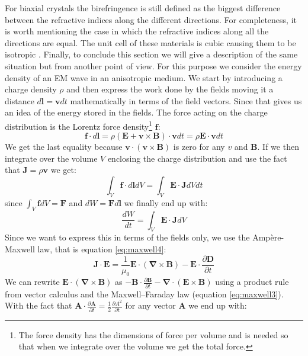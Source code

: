 For biaxial crystals the birefringence is still defined as the biggest difference between the refractive indices along the different directions. For completeness, it is worth mentioning the case in which the refractive indices along all the directions are equal. The unit cell of these materials is cubic causing them to be isotropic \cite{Hecht}. 
Finally, to conclude this section we will give a description of the same situation but from another point of view. For this purpose we consider the energy density of an EM wave in an anisotropic medium.
We start by introducing a charge density $\rho$ and then express the work done by the fields moving it a distance $d\bm{l}=\bm{v}dt$ mathematically in terms of the field vectors. Since that gives us an idea of the energy stored in the fields. The force acting on the charge distribution is the Lorentz force density\footnote{The force density has the dimensions of force per volume and is needed so that when we integrate over the volume we get the total force.} $\bm{f}$:
\begin{equation}
    \bm{f}\cdot d\bm{l}=\rho(\bm{E}+\bm{v}\times\bm{B})\cdot\bm{v}dt=\rho\bm{E}\cdot\bm{v}dt
\end{equation}
We get the last equality because $\bm{v}\cdot(\bm{v}\times\bm{B})$ is zero for any $v$ and $\bm{B}$. 
If we then integrate over the volume $V$ enclosing the charge distribution and use the fact that $\bm{J}=\rho\bm{v}$ we get:
\begin{equation}
    \int_V \bm{f}\cdot d\bm{l} dV =\int_V \bm{E}\cdot\bm{J} dVdt
\end{equation}
since $\int_V \bm{f} dV = \bm{F}$ and $dW = \bm{F} d\bm{l}$ we finally end up with:
\begin{equation}
    \label{eq:emf_work}
    \frac{dW}{dt} = \int_V \bm{E}\cdot\bm{J} dV
\end{equation}
Since we want to express this in terms of the fields only, we use the Ampère-Maxwell law, that is equation \ref{eq:maxwell4}:
\begin{equation}
    \bm{J}\cdot\bm{E} = \frac{1}{\mu_0}\bm{E}\cdot(\bm{\nabla}\times\bm{B})-\bm{E}\cdot\frac{\partial\bm{D}}{\partial t}
\end{equation}
We can rewrite $\bm{E}\cdot(\bm{\nabla}\times\bm{B})$ as $-\bm{B}\cdot\frac{\partial \bm{B}}{\partial t} - \bm{\nabla}\cdot(\bm{E}\times\bm{B})$ using a product rule from vector calculus and the Maxwell–Faraday law (equation \ref{eq:maxwell3}). With the fact that $\bm{A}\cdot\frac{\partial \bm{A}}{\partial t} = \frac{1}{2} \frac{\partial A^2}{\partial t}$ for any vector $\bm{A}$ we end up with:
